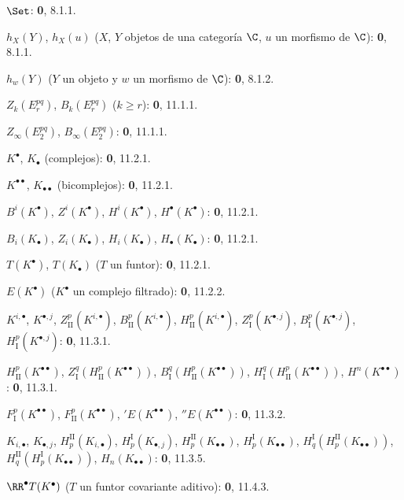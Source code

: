 \documentclass[oneside]{amsart}
\renewcommand{\geq}{\geqslant}
\begin{document}
\begin{flushleft}
$\Set$: \textbf 0, 8.1.1.

$h_X(Y)$, $h_X(u)$ ($X$, $Y$ objetos de una categoría $\C$, $u$ un morfismo
de $\C$): \textbf 0, 8.1.1.

$h_w(Y)$ ($Y$ un objeto y $w$ un morfismo de $\C$): \textbf 0, 8.1.2.

$Z_k(E_r^{pq})$, $B_k(E_r^{pq})$ ($k\geq r$): \textbf 0, 11.1.1.

$Z_\infty(E_2^{pq})$, $B_\infty(E_2^{pq})$: \textbf 0, 11.1.1.

$K^\bullet$, $K_\bullet$ (complejos): \textbf 0, 11.2.1.

$K^{\bullet\bullet}$, $K_{\bullet\bullet}$ (bicomplejos): \textbf 0, 11.2.1.

$B^i(K^\bullet)$, $Z^i(K^\bullet)$, $H^i(K^\bullet)$,
$H^\bullet(K^\bullet)$: \textbf 0, 11.2.1.

$B_i(K_\bullet)$, $Z_i(K_\bullet)$, $H_i(K_\bullet)$,
$H_\bullet(K_\bullet)$: \textbf 0, 11.2.1.

$T(K^\bullet)$, $T(K_\bullet)$ ($T$ un funtor): \textbf 0, 11.2.1.

$E(K^\bullet)$ ($K^\bullet$ un complejo filtrado): \textbf 0, 11.2.2.

$K^{i,\bullet}$, $K^{\bullet,j}$, $Z_{\mathrm{II}}^p(K^{i,\bullet})$,
$B_{\mathrm{II}}^p(K^{i,\bullet})$, $H_{\mathrm{II}}^p(K^{i,\bullet})$,
$Z_{\mathrm I}^p(K^{\bullet,j})$, $B_{\mathrm I}^p(K^{\bullet,j})$,
$H_{\mathrm I}^p(K^{\bullet,j})$: \textbf 0, 11.3.1.

$H_{\mathrm{II}}^p(K^{\bullet\bullet})$,
$Z_{\mathrm I}^q(H_{\mathrm{II}}^p(K^{\bullet\bullet}))$,
$B_{\mathrm I}^q(H_{\mathrm{II}}^p(K^{\bullet\bullet}))$,
$H_{\mathrm I}^q(H_{\mathrm{II}}^p(K^{\bullet\bullet}))$,
$H^n(K^{\bullet\bullet})$: \textbf 0, 11.3.1.

$F_{\mathrm I}^p(K^{\bullet\bullet})$,
$F_{\mathrm{II}}^p(K^{\bullet\bullet})$, ${}'E(K^{\bullet\bullet})$,
${}''E(K^{\bullet\bullet})$: \textbf 0, 11.3.2.

$K_{i,\bullet}$, $K_{\bullet,j}$, $H_p^{\mathrm{II}}(K_{i,\bullet})$,
$H_p^{\mathrm I}(K_{\bullet,j})$, $H_p^{\mathrm{II}}(K_{\bullet\bullet})$,
$H_p^{\mathrm I}(K_{\bullet\bullet})$,
$H_q^{\mathrm I}(H_p^{\mathrm{II}}(K_{\bullet\bullet}))$,
$H_q^{\mathrm{II}}(H_p^{\mathrm I}(K_{\bullet\bullet}))$,
$H_n(K_{\bullet\bullet})$: \textbf 0, 11.3.5.

$\RR^\bullet T(K^\bullet)$ ($T$ un funtor covariante aditivo): \textbf 0, 11.4.3.


\end{flushleft}
\end{document}
